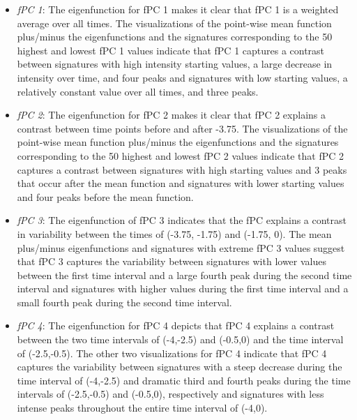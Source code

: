 \documentclass[letterpaper]{article}
\begin{document}
\begin{itemize}
\item \textit{fPC 1}: The eigenfunction for fPC 1 makes it clear that fPC 1 is a weighted average over all times. The visualizations of the point-wise mean function plus/minus the eigenfunctions and the signatures corresponding to the 50 highest and lowest fPC 1 values indicate that fPC 1 captures a contrast between signatures with high intensity starting values, a large decrease in intensity over time, and four peaks and signatures with low starting values, a relatively constant value over all times, and three peaks. 
\item \textit{fPC 2}: The eigenfunction for fPC 2 makes it clear that fPC 2 explains a contrast between time points before and after -3.75. The visualizations of the point-wise mean function plus/minus the eigenfunctions and the signatures corresponding to the 50 highest and lowest fPC 2 values indicate that fPC 2 captures a contrast between signatures with high starting values and 3 peaks that occur after the mean function and signatures with lower starting values and four peaks before the mean function. 
\item \textit{fPC 3}: The eigenfunction of fPC 3 indicates that the fPC explains a contrast in variability between the times of (-3.75, -1.75) and (-1.75, 0). The mean plus/minus eigenfunctions and signatures with extreme fPC 3 values suggest that fPC 3 captures the variability between signatures with lower values between the first time interval and a large fourth peak during the second time interval and signatures with higher values during the first time interval and a small fourth peak during the second time interval. 
\item \textit{fPC 4}: The eigenfunction for fPC 4 depicts that fPC 4 explains a contrast between the two time intervals of (-4,-2.5) and (-0.5,0) and the time interval of (-2.5,-0.5). The other two visualizations for fPC 4 indicate that fPC 4 captures the variability between signatures with a steep decrease during the time interval of (-4,-2.5) and dramatic third and fourth peaks during the time intervals of (-2.5,-0.5) and (-0.5,0), respectively and signatures with less intense peaks throughout the entire time interval of (-4,0). 
\end{itemize}
\end{document}
